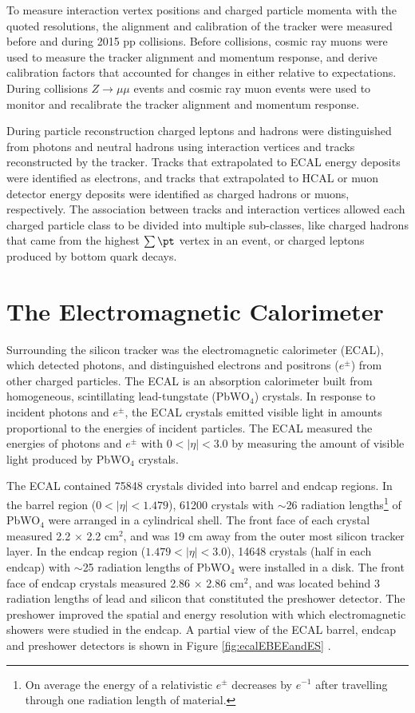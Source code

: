 To measure interaction vertex positions and charged particle momenta with the quoted resolutions, the alignment and calibration 
of the tracker were measured before and during 2015 pp collisions.  Before collisions, cosmic ray muons were 
used to measure the tracker alignment and momentum response, and derive calibration factors that accounted for 
changes in either relative to expectations.  During collisions $Z \rightarrow \mu\mu$ events and cosmic ray muon events 
were used to monitor and recalibrate the tracker alignment and momentum response.

During particle reconstruction charged leptons and hadrons were distinguished from photons and neutral hadrons using 
interaction vertices and tracks reconstructed by the tracker.  Tracks that extrapolated to ECAL energy deposits were 
identified as electrons, and tracks that extrapolated to HCAL or muon detector energy deposits were identified as charged 
hadrons or muons, respectively.  The association between tracks and interaction vertices allowed each charged particle class 
to be divided into multiple sub-classes, like charged hadrons that came from the highest $\sum \pt$ vertex in an event, 
or charged leptons produced by bottom quark decays.


\section{The Electromagnetic Calorimeter}
\label{sec:ecalDescription}
Surrounding the silicon tracker was the electromagnetic calorimeter (ECAL), which detected photons, and distinguished
electrons and positrons ($e^{\pm}$) from other charged particles.  
The ECAL is an absorption calorimeter built from homogeneous, scintillating lead-tungstate (PbWO$_{4}$) crystals.  
In response to incident photons and $e^{\pm}$, the ECAL crystals emitted visible light in amounts proportional to 
the energies of incident particles.  The ECAL measured the energies of photons and $e^{\pm}$ with $0 < |\eta| < 3.0$ by 
measuring the amount of visible light produced by PbWO$_{4}$ crystals.

The ECAL contained 75848 crystals \cite{ecalPerformanceInCollisions} divided into barrel and endcap regions.  In the 
barrel region ($0 < |\eta| < 1.479$), 61200 
crystals with $\sim$26 radiation lengths\footnote{On average the energy of a relativistic $e^{\pm}$ decreases by $e^{-1}$ after 
travelling through one radiation length of material.} of PbWO$_{4}$ were arranged in a cylindrical shell.  The front face of 
each crystal measured 2.2 $\times$ 2.2 cm$^{2}$, and was 19 cm away from the outer most silicon tracker layer.  
In the endcap region ($1.479 < |\eta| < 3.0$), 14648 crystals (half in each 
endcap) with $\sim$25 radiation lengths of PbWO$_{4}$ were installed in a disk.  The front face of endcap crystals measured 2.86 
$\times$ 2.86 cm$^{2}$, and was located behind 3 radiation lengths of lead and silicon that constituted the preshower detector.  
The preshower improved the spatial and energy resolution with 
which electromagnetic showers were studied in the endcap.  A partial view of the ECAL barrel, endcap and 
preshower detectors is shown in Figure \ref{fig:ecalEBEEandES} \cite{ecalTDR}.

